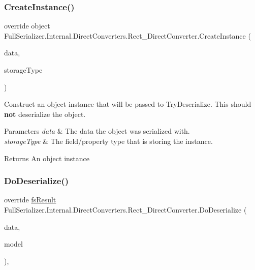 \subsubsection{\texorpdfstring{Create\+Instance()}{CreateInstance()}}
{\footnotesize\ttfamily override object Full\+Serializer.\+Internal.\+Direct\+Converters.\+Rect\+\_\+\+Direct\+Converter.\+Create\+Instance (\begin{DoxyParamCaption}\item[{\hyperlink{class_full_serializer_1_1fs_data}{fs\+Data}}]{data,  }\item[{Type}]{storage\+Type }\end{DoxyParamCaption})\hspace{0.3cm}{\ttfamily [inline]}}



Construct an object instance that will be passed to Try\+Deserialize. This should {\bfseries not} deserialize the object. 


\begin{DoxyParams}{Parameters}
{\em data} & The data the object was serialized with.\\
\hline
{\em storage\+Type} & The field/property type that is storing the instance.\\
\hline
\end{DoxyParams}
\begin{DoxyReturn}{Returns}
An object instance
\end{DoxyReturn}
\mbox{\label{class_full_serializer_1_1_internal_1_1_direct_converters_1_1_rect___direct_converter_a91f4f7c64ff15f6ff136e59cc9192263}} 
\subsubsection{\texorpdfstring{Do\+Deserialize()}{DoDeserialize()}}
{\footnotesize\ttfamily override \hyperlink{struct_full_serializer_1_1fs_result}{fs\+Result} Full\+Serializer.\+Internal.\+Direct\+Converters.\+Rect\+\_\+\+Direct\+Converter.\+Do\+Deserialize (\begin{DoxyParamCaption}\item[{Dictionary$<$ string, \hyperlink{class_full_serializer_1_1fs_data}{fs\+Data} $>$}]{data,  }\item[{ref Rect}]{model }\end{DoxyParamCaption})\hspace{0.3cm}{\ttfamily [inline]}, {\ttfamily [protected]}}



